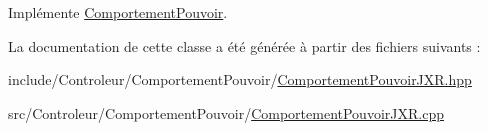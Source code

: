Implémente \hyperlink{class_comportement_pouvoir_a8b8f4e753291ab73ab0016106f3948ff}{Comportement\-Pouvoir}.



La documentation de cette classe a été générée à partir des fichiers suivants \-:\begin{DoxyCompactItemize}
\item 
include/\-Controleur/\-Comportement\-Pouvoir/\hyperlink{_comportement_pouvoir_j_x_r_8hpp}{Comportement\-Pouvoir\-J\-X\-R.\-hpp}\item 
src/\-Controleur/\-Comportement\-Pouvoir/\hyperlink{_comportement_pouvoir_j_x_r_8cpp}{Comportement\-Pouvoir\-J\-X\-R.\-cpp}\end{DoxyCompactItemize}
